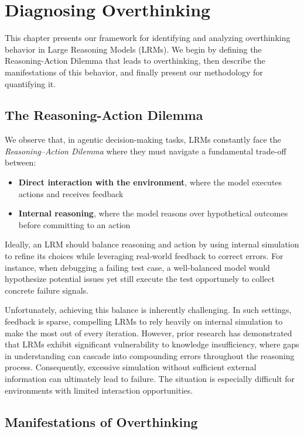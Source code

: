 \chapter{Diagnosing Overthinking}
\label{overthinking}

This chapter presents our framework for identifying and analyzing overthinking behavior in Large Reasoning Models (LRMs). We begin by defining the Reasoning-Action Dilemma that leads to overthinking, then describe the manifestations of this behavior, and finally present our methodology for quantifying it.

\section{The Reasoning-Action Dilemma}
\label{sec:dilemma_detailed}

We observe that, in agentic decision-making tasks, LRMs constantly face the \emph{Reasoning–Action Dilemma} where they must navigate a fundamental trade-off between:
\begin{itemize}
    \item \textbf{Direct interaction with the environment}, where the model executes actions and receives feedback
    \item \textbf{Internal reasoning}, where the model reasons over hypothetical outcomes before committing to an action
\end{itemize}

Ideally, an LRM should balance reasoning and action by using internal simulation to refine its choices while leveraging real-world feedback to correct errors. For instance, when debugging a failing test case, a well-balanced model would hypothesize potential issues yet still execute the test opportunely to collect concrete failure signals.

Unfortunately, achieving this balance is inherently challenging. In such settings, feedback is sparse, compelling LRMs to rely heavily on internal simulation to make the most out of every iteration. However, prior research has demonstrated that LRMs exhibit significant vulnerability to knowledge insufficiency, where gaps in understanding can cascade into compounding errors throughout the reasoning process. Consequently, excessive simulation without sufficient external information can ultimately lead to failure. The situation is especially difficult for environments with limited interaction opportunities.

\section{Manifestations of Overthinking}
\label{sec:manifestations_detailed}

